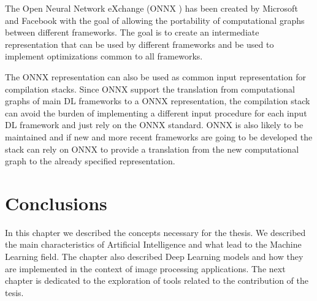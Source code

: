 \documentclass[../main.tex]{subfiles}
\begin{document}
The Open Neural Network eXchange (ONNX \cite{onnx}) has been created by Microsoft and Facebook with the goal of allowing the portability of computational graphs between different frameworks. 
The goal is to create an intermediate representation that can be used by different frameworks and be used to implement optimizations common to all frameworks.

The ONNX representation can also be used as common input representation for compilation stacks.
Since ONNX support the translation from computational graphs of main DL frameworks to a ONNX representation, the compilation stack can avoid the burden of implementing a different input procedure for each input DL framework and just rely on the ONNX standard.
ONNX is also likely to be maintained and if new and more recent frameworks are going to be developed the stack can rely on ONNX to provide a translation from the new computational graph to the already specified representation.

\section{Conclusions}
In this chapter we described the concepts necessary for the thesis. 
We described the main characteristics of Artificial Intelligence and what lead to the Machine Learning field.
The chapter also described Deep Learning models and how they are implemented in the context of image processing applications.
The next chapter is dedicated to the exploration of tools related to the contribution of the tesis.
\end{document}
